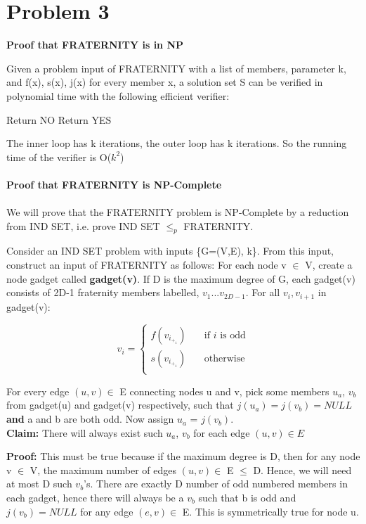 \section*{Problem 3}

{\bf Proof that FRATERNITY is in NP}

Given a problem input of FRATERNITY with a list of members, parameter
k, and f(x), s(x), j(x) for every member x, a solution set S can be
verified in polynomial time with the following efficient verifier:

\begin{algorithm}[H]
\caption{}
\begin{algorithmic}[1]
\State Return NO
\EndIf
\EndFor
\EndFor
\State Return YES
\end{algorithmic}
\end{algorithm}
The inner loop has k iterations, the outer loop has k
iterations. So the running time of the verifier is O($k^2$)\\
\\
{\bf Proof that FRATERNITY is NP-Complete}\\
\\
We will prove that the FRATERNITY problem is NP-Complete by a
reduction from IND SET, i.e. prove IND SET $\leq_p$ FRATERNITY.

Consider an IND SET problem with inputs \{G=(V,E), k\}. From this input, construct an input of FRATERNITY as follows:
For each node v $\in$ V, create a node gadget called {\bf gadget(v)}. If D is the maximum degree of G, each gadget(v) consists of 2D-1 fraternity members labelled, $v_1$...$v_{2D-1}$. For all $v_i, v_{i+1}$ in gadget(v):

\[
v_i =
    \begin{cases}
        f(v_i_+_1) &\quad \text{if $i$ is odd} \\
        s(v_i_+_1) &\quad \text{otherwise} \\
    \end{cases}
\]

For every edge $(u,v) \in$ E connecting nodes u and v, pick some members $u_a$, $v_b$ from gadget(u) and gadget(v) respectively, such that $j(u_a) = j(v_b) = NULL$ \textbf{and} a and b are both odd. Now assign $u_a$ = $j(v_b)$.\\

\textbf{Claim:} There will always exist such $u_a$, $v_b$ for each edge $(u,v) \in E$

\textbf{Proof:} This must be true because if the maximum degree is D, then for any node v $\in$ V, the maximum number of edges $(u,v) \in$ E $\leq$ D. Hence, we will need at most D such $v_b$'s. There are exactly D number of odd numbered members in each gadget, hence there will always be a $v_b$ such that b is odd and $j(v_b) = NULL$ for any edge $(e,v) \in$ E. This is symmetrically true for node u.\\

